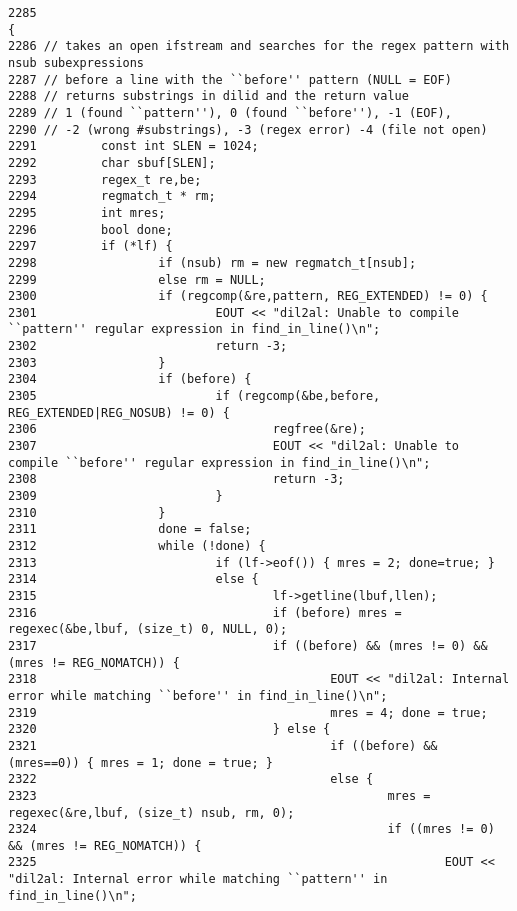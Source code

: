 \footnotesize\begin{verbatim}2285                                                                                                                             {
2286 // takes an open ifstream and searches for the regex pattern with nsub subexpressions
2287 // before a line with the ``before'' pattern (NULL = EOF)
2288 // returns substrings in dilid and the return value
2289 // 1 (found ``pattern''), 0 (found ``before''), -1 (EOF),
2290 // -2 (wrong #substrings), -3 (regex error) -4 (file not open)
2291         const int SLEN = 1024;
2292         char sbuf[SLEN];
2293         regex_t re,be;
2294         regmatch_t * rm;
2295         int mres;
2296         bool done;
2297         if (*lf) {
2298                 if (nsub) rm = new regmatch_t[nsub];
2299                 else rm = NULL;
2300                 if (regcomp(&re,pattern, REG_EXTENDED) != 0) {
2301                         EOUT << "dil2al: Unable to compile ``pattern'' regular expression in find_in_line()\n";
2302                         return -3;
2303                 }
2304                 if (before) {
2305                         if (regcomp(&be,before, REG_EXTENDED|REG_NOSUB) != 0) {
2306                                 regfree(&re);
2307                                 EOUT << "dil2al: Unable to compile ``before'' regular expression in find_in_line()\n";
2308                                 return -3;
2309                         }
2310                 }
2311                 done = false;
2312                 while (!done) {
2313                         if (lf->eof()) { mres = 2; done=true; }
2314                         else {
2315                                 lf->getline(lbuf,llen);
2316                                 if (before) mres = regexec(&be,lbuf, (size_t) 0, NULL, 0);
2317                                 if ((before) && (mres != 0) && (mres != REG_NOMATCH)) {
2318                                         EOUT << "dil2al: Internal error while matching ``before'' in find_in_line()\n";
2319                                         mres = 4; done = true;
2320                                 } else {
2321                                         if ((before) && (mres==0)) { mres = 1; done = true; }
2322                                         else {
2323                                                 mres = regexec(&re,lbuf, (size_t) nsub, rm, 0);
2324                                                 if ((mres != 0) && (mres != REG_NOMATCH)) {
2325                                                         EOUT << "dil2al: Internal error while matching ``pattern'' in find_in_line()\n";

\end{verbatim}

